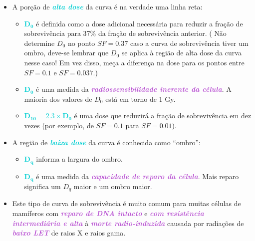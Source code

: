 \documentclass[11pt,a4paper]{article}
\newcounter{exemplo}
\begin{document}
	\begin{itemize}
		\item A porção de \textcolor{DarkTurquoise}{\textbf{\textit{alta dose}}} da curva é na verdade uma linha reta:
		
		\begin{itemize}[label=\textcolor{CarnationPink}{$\star$}]
			\item \textcolor{DarkTurquoise}{$\mathbf{D_0}$} é definida como a dose adicional necessária para reduzir a fração de sobrevivência para 37\% da fração de sobrevivência anterior. (\textcolor{MediumOrchid}{\textbf{}} Não determine $D_0$ no ponto $SF = 0.37$ caso a curva de sobrevivência tiver um ombro, deve-se lembrar que $D_0$ se aplica à região de alta dose da curva nesse caso! Em vez disso, meça a diferença na dose para os pontos entre $SF = 0.1$ e $SF = 0.037$.)
		
			\item \textcolor{DarkTurquoise}{$\mathbf{D_0}$} é uma medida da \textcolor{MediumOrchid}{\textbf{\textit{radiossensibilidade inerente da célula}}}. A maioria dos valores de $D_0$ está em torno de 1 Gy.
		
			\item \textcolor{DarkTurquoise}{$\mathbf{D_{10} = 2.3 \times D_0}$} é uma dose que reduzirá a fração de sobrevivência em dez vezes (por exemplo, de $SF = 0.1$ para $SF = 0.01$).
		\end{itemize}

		\item A região de \textcolor{DarkTurquoise}{\textbf{\textit{baixa dose}}} da curva é conhecida como “ombro”:
		\begin{itemize}[label=\textcolor{CarnationPink}{$\star$}]
			\item \textcolor{DarkTurquoise}{$\mathbf{D_q}$} informa a largura do ombro.
			\item \textcolor{DarkTurquoise}{$\mathbf{D_q}$} é uma medida da \textcolor{MediumOrchid}{\textbf{\textit{capacidade de reparo da célula}}}. Mais reparo significa um $D_q$ maior e um ombro maior.
		\end{itemize}

		\item Este tipo de curva de sobrevivência é muito comum para muitas células de mamíferos com \textcolor{MediumOrchid}{\textbf{\textit{reparo de DNA intacto}}} e \textcolor{MediumOrchid}{\textbf{\textit{com resistência intermediária e alta}}} à \textcolor{MediumOrchid}{\textbf{\textit{morte radio-induzida}}} causada por radiações de \textcolor{MediumOrchid}{\textbf{\textit{baixo LET}}} de raios X e raios gama.
	\end{itemize}
\end{document}
